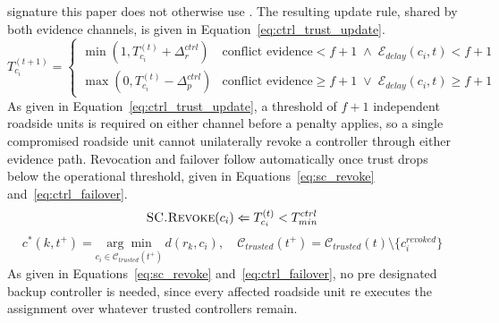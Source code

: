 \documentclass[final,5p,twocolumn]{elsarticle}
\theoremstyle{remark}
\theoremstyle{plain}
\begin{document}
signature this paper does not otherwise use \cite{Phantom2026}. The
resulting update rule, shared by both evidence channels, is given in
Equation~\eqref{eq:ctrl_trust_update}.
\begin{equation}
	T_{c_i}^{(t+1)} =
	\begin{cases}
		\min(1, T_{c_i}^{(t)} + \Delta_r^{ctrl}) & \text{conflict evidence} < f{+}1 \;\land\; \mathcal{E}_{delay}(c_i,t) < f{+}1 \\
		\max(0, T_{c_i}^{(t)} - \Delta_p^{ctrl}) & \text{conflict evidence} \geq f{+}1 \;\lor\; \mathcal{E}_{delay}(c_i,t) \geq f{+}1
	\end{cases}
	\label{eq:ctrl_trust_update}
\end{equation}
As given in Equation~\eqref{eq:ctrl_trust_update}, a threshold of $f{+}1$
independent roadside units is required on either channel before a penalty
applies, so a single compromised roadside unit cannot unilaterally revoke a
controller through either evidence path. Revocation and failover follow
automatically once trust drops below the operational threshold, given in
Equations~\eqref{eq:sc_revoke} and~\eqref{eq:ctrl_failover}.
\begin{equation}
	\textsc{SC.Revoke}(c_i) \Leftarrow T_{c_i}^{(t)} < T_{min}^{ctrl}
	\label{eq:sc_revoke}
\end{equation}
\begin{equation}
	c^*(k, t^+) = \underset{c_i \in \mathcal{C}_{trusted}(t^+)}{\arg\min}\, d(r_k, c_i), \quad \mathcal{C}_{trusted}(t^+) = \mathcal{C}_{trusted}(t) \setminus \{c_i^{revoked}\}
	\label{eq:ctrl_failover}
\end{equation}
As given in Equations~\eqref{eq:sc_revoke} and~\eqref{eq:ctrl_failover}, no
pre designated backup controller is needed, since every affected roadside
unit re executes the assignment over whatever trusted controllers remain.
\end{document}
